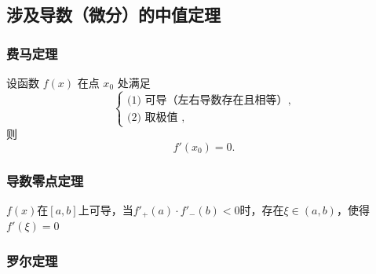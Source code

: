 \documentclass[a4paper,12pt]{article}
\begin{document}
    \subsection{涉及导数（微分）的中值定理}

    \subsubsection{费马定理}

    设函数 $f(x)$ 在点 $x_0$ 处满足
    \[
        \begin{cases}
            \text{(1) 可导（左右导数存在且相等）},\\
            \text{(2) 取极值 },
        \end{cases}
    \]
    则
    \[
        f'(x_0)=0.
    \]

    \subsubsection{导数零点定理}

    $f(x)$在$[a, b]$上可导，当$f'_{+}(a) \cdot f'_{-}(b) < 0$时，存在$\xi \in (a, b)$，使得$f'(\xi) = 0$
    \\

    \subsubsection{罗尔定理}
\end{document}
